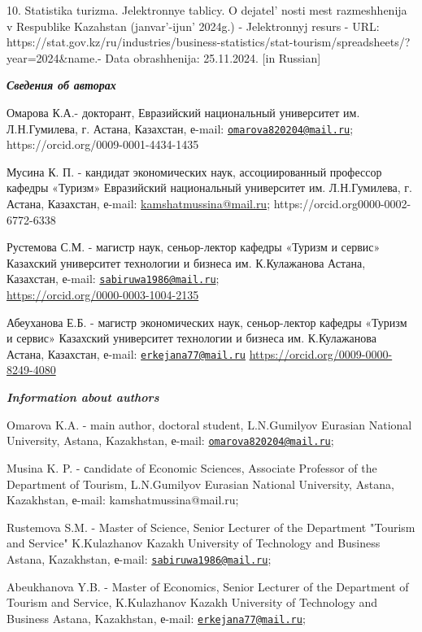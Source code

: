 10. Statistika turizma. Jelektronnye tablicy. O
dejatel' nosti mest razmeshhenija v Respublike Kazahstan
(janvar'-ijun'{} 2024g.) - Jelektronnyj
resurs - URL:
https://stat.gov.kz/ru/industries/business-statistics/stat-tourism/spreadsheets/?year=2024\&name.-
Data obrashhenija: 25.11.2024. {[}in Russian{]}

\emph{{\bfseries Сведения об авторах}}

{\bfseries \hfill\break
}Омарова К.А.- докторант, Евразийский национальный университет им.
Л.Н.Гумилева, г. Астана, Казахстан, е-mail:
\href{mailto:omarova820204@mail.ru}{\nolinkurl{omarova820204@mail.ru}};
https://orcid.org/0009-0001-4434-1435

Мусина К. П. - кандидат экономических наук, ассоциированный профессор
кафедры «Туризм» Евразийский национальный университет им. Л.Н.Гумилева,
г. Астана, Казахстан, е-mail:
\href{mailto:2kamshatmussina@mail.ru}{kamshatmussina@mail.ru};
https://orcid.org0000-0002-6772-6338

Рустемова С.М. - магистр наук, сеньор-лектор кафедры «Туризм и сервис»
Казахский университет технологии и бизнеса им. К.Кулажанова Астана,
Казахстан, е-mail:
\href{mailto:sabiruwa1986@mail.ru}{\nolinkurl{sabiruwa1986@mail.ru}};\\
\url{https://orcid.org/0000-0003-1004-2135}

Абеуханова Е.Б. - магистр экономических наук, сеньор-лектор кафедры
«Туризм и сервис» Казахский университет технологии и бизнеса им.
К.Кулажанова Астана, Казахстан, е-mail:
\href{mailto:erkejana77@mail.ru}{\nolinkurl{erkejana77@mail.ru}}
\url{https://orcid.org/0009-0000-8249-4080}

\emph{{\bfseries Information about authors}}

Omarova K.A. - main author, doctoral student, L.N.Gumilyov Eurasian
National University, Astana, Kazakhstan, е-mail:
\href{mailto:omarova820204@mail.ru}{\nolinkurl{omarova820204@mail.ru}};

Musina K. P. - сandidate of Economic Sciences, Associate Professor of
the Department of Tourism, L.N.Gumilyov Eurasian National University,
Astana, Kazakhstan, е-mail: kamshatmussina@mail.ru;

Rustemova S.M. - Master of Science, Senior Lecturer of the Department
"Tourism and Service" K.Kulazhanov Kazakh University of Technology and
Business Astana, Kazakhstan, е-mail:
\href{mailto:sabiruwa1986@mail.ru}{\nolinkurl{sabiruwa1986@mail.ru}};

Abeukhanova Y.B. - Master of Economics, Senior Lecturer of the
Department of Tourism and Service, K.Kulazhanov Kazakh University of
Technology and Business Astana, Kazakhstan, е-mail:
\href{mailto:erkejana77@mail.ru}{\nolinkurl{erkejana77@mail.ru}};\